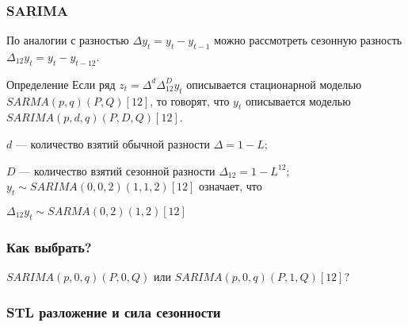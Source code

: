 \begin{frame}
  \frametitle{SARIMA}

  По аналогии с разностью $\Delta y_t = y_t - y_{t-1}$ можно рассмотреть сезонную разность $\Delta_{12} y_t = y_t - y_{t-12}$. 

  \pause 
  \begin{block}{Определение}
    Если ряд $z_t = \Delta^d \Delta^D_{12} y_t$ описывается стационарной моделью $SARMA(p, q)(P, Q)[12]$,
    то говорят, что $y_t$ описывается моделью $SARIMA(p, d, q)(P, D, Q)[12]$.
  \end{block}
  \pause
  $d$ — количество взятий обычной разности $\Delta = 1 - L$;

  $D$ — количество взятий сезонной разности $\Delta_{12} = 1- L^{12}$;
  \pause
  $y_t \sim SARIMA(0, 0, 2)(1, 1, 2)[12]$ означает, что 
  
  $\Delta_{12} y_t \sim SARMA(0, 2)(1, 2)[12]$
\end{frame}

\begin{frame}
  \frametitle{Как выбрать?}
  
  $SARIMA(p, 0, q)(P, 0, Q)$ или $SARIMA(p, 0, q)(P, 1, Q)[12]$?

  \begin{itemize}
    

    


    
    
  \end{itemize}

\end{frame}


\begin{frame}
  \frametitle{STL разложение и сила сезонности}

  

\end{frame}



